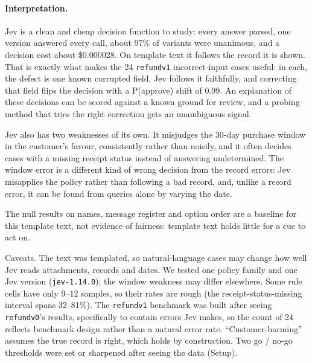 \documentclass[11pt]{article}
\renewcommand{\_}{\origunderscore\allowbreak}
\begin{document}
\paragraph{Interpretation.}
Jev is a clean and cheap decision function to study: every answer parsed, one version answered every call, about 97\% of variants were unanimous, and a decision cost about \$0.000028. On template text it follows the record it is shown. That is exactly what makes the 24 \texttt{refund\_v1} incorrect-input cases useful: in each, the defect is one known corrupted field, Jev follows it faithfully, and correcting that field flips the decision with a P(approve) shift of 0.99. An explanation of these decisions can be scored against a known ground for review, and a probing method that tries the right correction gets an unambiguous signal.

Jev also has two weaknesses of its own. It misjudges the 30-day purchase window in the customer's favour, consistently rather than noisily, and it often decides cases with a missing receipt status instead of answering undetermined. The window error is a different kind of wrong decision from the record errors: Jev misapplies the policy rather than following a bad record, and, unlike a record error, it can be found from queries alone by varying the date.

The null results on names, message register and option order are a baseline for this template text, not evidence of fairness: template text holds little for a cue to act on.

Caveats. The text was templated, so natural-language cases may change how well Jev reads attachments, records and dates. We tested one policy family and one Jev version (\texttt{jev-1.14.0}); the window weakness may differ elsewhere. Some rule cells have only 9--12 samples, so their rates are rough (the receipt-status-missing interval spans 32--81\%). The \texttt{refund\_v1} benchmark was built after seeing \texttt{refund\_v0}'s results, specifically to contain errors Jev makes, so the count of 24 reflects benchmark design rather than a natural error rate. ``Customer-harming'' assumes the true record is right, which holds by construction. Two go / no-go thresholds were set or sharpened after seeing the data (Setup).
\end{document}
